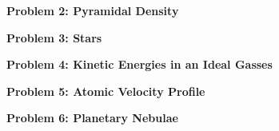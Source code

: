 \documentclass{article}
\begin{document}
\noindent \textbf{Problem 2: Pyramidal Density}

\noindent \textbf{Problem 3: Stars}

\noindent \textbf{Problem 4: Kinetic Energies in an Ideal Gasses}

\noindent \textbf{Problem 5: Atomic Velocity Profile}

\noindent \textbf{Problem 6: Planetary Nebulae}
\end{document}
